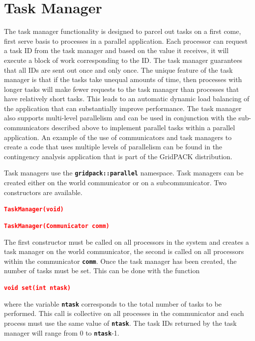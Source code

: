 \documentclass[12pt]{report} %
\begin{document}
\section{Task Manager}

The task manager functionality is designed to parcel out tasks on a first come, first serve basis to processes in a parallel application. Each processor can request a task ID from the task manager and based on the value it receives, it will execute a block of work corresponding to the ID. The task manager guarantees that all IDs are sent out once and only once. The unique feature of the task manager is that if the tasks take unequal amounts of time, then processes with longer tasks will make fewer requests to the task manager than processes that have relatively short tasks. This leads to an automatic dynamic load balancing of the application that can substantially improve performance. The task manager also supports multi-level parallelism and can be used in conjunction with the sub-communicators described above to implement parallel tasks within a parallel application. An example of the use of communicators and task managers to create a code that uses multiple levels of parallelism can be found in the contingency analysis application that is part of the GridPACK distribution.

Task managers use the \texttt{\textbf{gridpack::parallel}} namespace. Task managers can be created either on the world communicator or on a subcommunicator. Two constructors are available.

\textcolor{red}{\texttt{\textbf{TaskManager(void)}}}


\textcolor{red}{\texttt{\textbf{TaskManager(Communicator comm)}}}

The first constructor must be called on all processors in the system and creates a task manager on the world communicator, the second is called on all processors within the communicator \texttt{\textbf{comm}}. Once the task manager has been created, the number of tasks must be set. This can be done with the function

\textcolor{red}{\texttt{\textbf{void set(int ntask)}}}

where the variable \texttt{\textbf{ntask}} corresponds to the total number of tasks to be performed. This call is collective on all processes in the communicator and each process must use the same value of \texttt{\textbf{ntask}}. The task IDs returned by the task manager will range from 0 to \texttt{\textbf{ntask}}-1.
\end{document}
